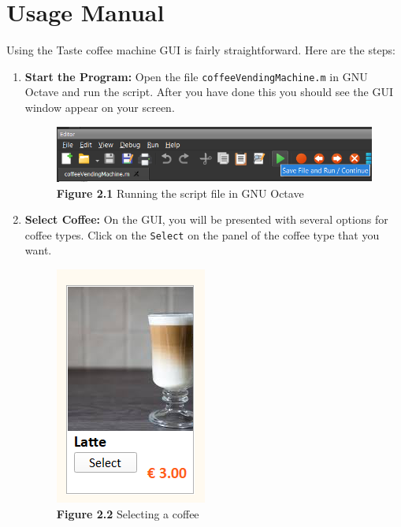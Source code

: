 \documentclass[a4paper, 11pt]{article}
\begin{document}
\section{Usage Manual}

\noindent Using the Taste coffee machine GUI is fairly straightforward. Here are the steps:

\begin{enumerate}
\item \textbf{Start the Program:}
Open the file \texttt{coffeeVendingMachine.m} in GNU Octave and run the script. After you have done this you should see the GUI window appear on your screen.
\vspace{3mm} 
\begin{figure}[H]
\centering
\includegraphics{Images/Figure2.1.PNG}
\caption*{\textbf{Figure 2.1} Running the script file in GNU Octave} 
\end{figure}
\vspace{5mm} 

\item \textbf{Select Coffee:}
On the GUI, you will be presented with several options for coffee types. Click on the \texttt{Select} on the panel of the coffee type that you want.
\vspace{3mm} 
\begin{figure}[H]
\centering
\includegraphics{Images/Figure2.2.PNG}
\caption*{\textbf{Figure 2.2} Selecting a coffee} 
\end{figure}
\vspace{5mm} 


\end{enumerate}
\end{document}

